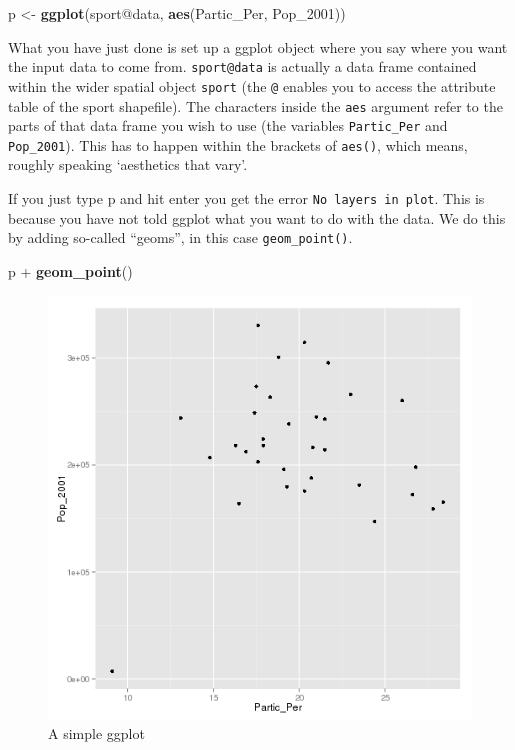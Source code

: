 \documentclass[]{article}
\newenvironment{Shaded}{}{}
\newcommand{\KeywordTok}[1]{\textcolor[rgb]{0.00,0.44,0.13}{\textbf{{#1}}}}
\newcommand{\StringTok}[1]{\textcolor[rgb]{0.25,0.44,0.63}{{#1}}}
\newcommand{\NormalTok}[1]{{#1}}
\begin{document}
\begin{Shaded}
\begin{Highlighting}[]
\NormalTok{p <-}\StringTok{ }\KeywordTok{ggplot}\NormalTok{(sport@data, }\KeywordTok{aes}\NormalTok{(Partic_Per, Pop_2001))}
\end{Highlighting}
\end{Shaded}

What you have just done is set up a ggplot object where you say where
you want the input data to come from. \texttt{sport@data} is actually a
data frame contained within the wider spatial object \texttt{sport} (the
\texttt{@} enables you to access the attribute table of the sport
shapefile). The characters inside the \texttt{aes} argument refer to the
parts of that data frame you wish to use (the variables
\texttt{Partic\_Per} and \texttt{Pop\_2001}). This has to happen within
the brackets of \texttt{aes()}, which means, roughly speaking
`aesthetics that vary'.

If you just type p and hit enter you get the error
\texttt{No layers in plot}. This is because you have not told ggplot
what you want to do with the data. We do this by adding so-called
``geoms'', in this case \texttt{geom\_point()}.

\begin{Shaded}
\begin{Highlighting}[]
\NormalTok{p +}\StringTok{ }\KeywordTok{geom_point}\NormalTok{()}
\end{Highlighting}
\end{Shaded}

\begin{figure}[htbp]
\centering
\includegraphics{figure/A_simple_ggplot.png}
\caption{A simple ggplot}
\end{figure}
\end{document}
